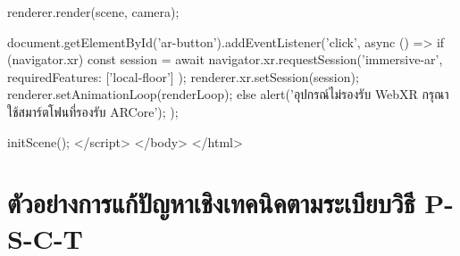 \begin{pythonbox}
{            renderer.render(scene, camera);
        }

        document.getElementById('ar-button').addEventListener('click', async () => {
            if (navigator.xr) {
                const session = await navigator.xr.requestSession('immersive-ar', {
                    requiredFeatures: ['local-floor']
                });
                renderer.xr.setSession(session);
                renderer.setAnimationLoop(renderLoop);
            } else {
                alert('อุปกรณ์ไม่รองรับ WebXR กรุณาใช้สมาร์ตโฟนที่รองรับ ARCore');
            }
        });

        initScene();
    </script>
</body>
</html>
\end{pythonbox}

\section{ตัวอย่างการแก้ปัญหาเชิงเทคนิคตามระเบียบวิธี P-S-C-T}

